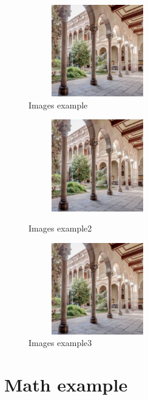 \begin{figure}[H]
    \centering
    \includegraphics[width=6cm, height=4cm]{images/edifici-historic-universitat-de-barcelona.jpg}
    \caption{Images example}
    \label{taula}
\end{figure}%



\begin{figure}[H]
    \centering
    \begin{minipage}[t]{0.48\textwidth}
        \centering
        \includegraphics[width=6cm, height=4cm]{images/edifici-historic-universitat-de-barcelona.jpg}
        \caption{Images example2}
    \end{minipage}
    \begin{minipage}[t]{0.48\textwidth}
        \centering
        \includegraphics[width=6cm, height=4cm]{images/edifici-historic-universitat-de-barcelona.jpg}
        \caption{Images example3}
    \end{minipage}
\end{figure}


\section{Math example}

